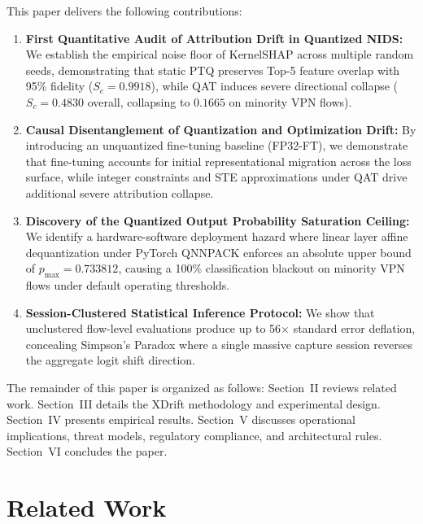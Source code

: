\documentclass[conference]{IEEEtran}
\begin{document}
This paper delivers the following contributions:
\begin{enumerate}
    \item \textbf{First Quantitative Audit of Attribution Drift in Quantized NIDS:} We establish the empirical noise floor of KernelSHAP across multiple random seeds, demonstrating that static PTQ preserves Top-5 feature overlap with 95\% fidelity ($S_c = 0.9918$), while QAT induces severe directional collapse ($S_c = 0.4830$ overall, collapsing to $0.1665$ on minority VPN flows).
    \item \textbf{Causal Disentanglement of Quantization and Optimization Drift:} By introducing an unquantized fine-tuning baseline (FP32-FT), we demonstrate that fine-tuning accounts for initial representational migration across the loss surface, while integer constraints and STE approximations under QAT drive additional severe attribution collapse.
    \item \textbf{Discovery of the Quantized Output Probability Saturation Ceiling:} We identify a hardware-software deployment hazard where linear layer affine dequantization under PyTorch QNNPACK enforces an absolute upper bound of $p_{\max} = 0.733812$, causing a 100\% classification blackout on minority VPN flows under default operating thresholds.
    \item \textbf{Session-Clustered Statistical Inference Protocol:} We show that unclustered flow-level evaluations produce up to 56$\times$ standard error deflation, concealing Simpson's Paradox where a single massive capture session reverses the aggregate logit shift direction.
\end{enumerate}

The remainder of this paper is organized as follows: Section~II reviews related work. Section~III details the XDrift methodology and experimental design. Section~IV presents empirical results. Section~V discusses operational implications, threat models, regulatory compliance, and architectural rules. Section~VI concludes the paper.

\section{Related Work}
\end{document}
